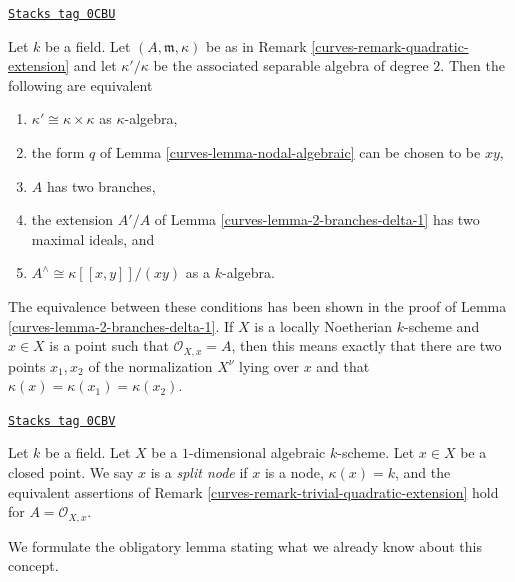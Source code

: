 \begin{remark}

\label{curves-remark-trivial-quadratic-extension}
\href{https://stacks.math.columbia.edu/tag/0CBU}{\texttt{Stacks tag 0CBU}}

Let $k$ be a field. Let $(A, \mathfrak m, \kappa)$ be as in
Remark \ref{curves-remark-quadratic-extension} and let $\kappa'/\kappa$
be the associated separable algebra of degree $2$.
Then the following are equivalent
\begin{enumerate}
\item $\kappa' \cong \kappa \times \kappa$ as $\kappa$-algebra,
\item the form $q$ of Lemma \ref{curves-lemma-nodal-algebraic}
can be chosen to be $xy$,
\item $A$ has two branches,
\item the extension $A'/A$ of Lemma \ref{curves-lemma-2-branches-delta-1}
has two maximal ideals, and
\item $A^\wedge \cong \kappa[[x, y]]/(xy)$ as a $k$-algebra.
\end{enumerate}
The equivalence between these conditions has been shown in the
proof of Lemma \ref{curves-lemma-2-branches-delta-1}. If $X$ is a
locally Noetherian $k$-scheme and $x \in X$ is a point such that
$\mathcal{O}_{X, x} = A$, then this means exactly that
there are two points $x_1, x_2$ of the normalization $X^\nu$
lying over $x$ and that $\kappa(x) = \kappa(x_1) = \kappa(x_2)$.
\end{remark}

\begin{definition}
\label{curves-definition-split-node}
\href{https://stacks.math.columbia.edu/tag/0CBV}{\texttt{Stacks tag 0CBV}}

Let $k$ be a field. Let $X$ be a $1$-dimensional algebraic $k$-scheme.
Let $x \in X$ be a closed point. We say $x$ is a {\it split node}
if $x$ is a node, $\kappa(x) = k$, and the equivalent assertions of
Remark \ref{curves-remark-trivial-quadratic-extension}
hold for $A = \mathcal{O}_{X, x}$.
\end{definition}

We formulate the obligatory lemma stating what we already know
about this concept.


